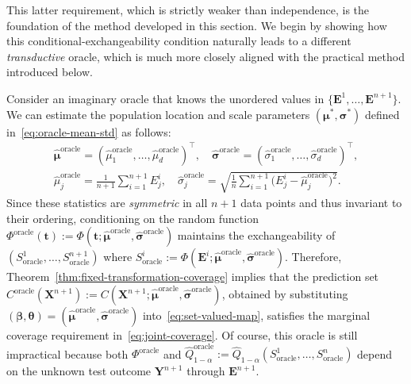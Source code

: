 This latter requirement, which is strictly weaker than independence, is the foundation of the method developed in this section.
We begin by showing how this conditional-exchangeability condition naturally leads to a different \emph{transductive} oracle, which is much more closely aligned with the practical method introduced below.

{\color{blue}
Consider an imaginary oracle that knows the unordered values in $\{\mathbf{E}^1,\ldots,\mathbf{E}^{n+1}\}$. We can estimate the population location and scale parameters $(\boldsymbol \mu^*, \boldsymbol\sigma^*)$ defined in~\eqref{eq:oracle-mean-std} as follows:
\begin{equation} \label{eq:transductive-oracle-mean-std}
\begin{aligned}
\boldsymbol{\hat{\mu}}^{\mathrm{oracle}} = (\hat{\mu}^{\mathrm{oracle}}_1,\ldots,\hat{\mu}^{\mathrm{oracle}}_d)^\top,
\quad
\boldsymbol{\hat{\sigma}}^{\mathrm{oracle}} = (\hat{\sigma}^{\mathrm{oracle}}_1,\ldots,\hat{\sigma}^{\mathrm{oracle}}_d)^\top,\\
\hat{\mu}^{\mathrm{oracle}}_j  = \frac{1}{n+1} \sum_{i=1}^{n+1} {E}^i_j,
\quad
\hat{\sigma}^{\mathrm{oracle}}_j 
= \sqrt{\frac{1}{n} \sum_{i=1}^{n+1} \!\bigl({E}^i_j - \hat{\mu}^{\mathrm{oracle}}_j\bigr)^2}.
\end{aligned}
\end{equation}
Since these statistics are \emph{symmetric} in all $n+1$ data points and thus invariant to their ordering, conditioning on the random function $\Phi^\mathrm{oracle}(\mathbf t):=\Phi(\mathbf t; \boldsymbol{\hat{\mu}}^{\mathrm{oracle}}, \boldsymbol{\hat{\sigma}}^{\mathrm{oracle}} )$ maintains the exchangeability of $(S^1_{\mathrm{oracle}},\ldots,S^{n+1}_{\mathrm{oracle}})$ where $S^i_{\mathrm{oracle}}:= \Phi(\mathbf{E}^i; \boldsymbol{\hat{\mu}}^{\mathrm{oracle}}, \boldsymbol{\hat{\sigma}}^{\mathrm{oracle}})$. Therefore, Theorem~\ref{thm:fixed-transformation-coverage} implies that the prediction set ${C}^{\mathrm{oracle}}(\mathbf{X}^{n+1}):= C(\mathbf{X}^{n+1};\hat{\boldsymbol\mu}^{\mathrm{oracle}}, \hat{\boldsymbol\sigma}^{\mathrm{oracle}})$, obtained by substituting $(\boldsymbol \beta, \boldsymbol \theta) = (\hat{\boldsymbol\mu}^{\mathrm{oracle}}, \hat{\boldsymbol\sigma}^{\mathrm{oracle}})$ into~\eqref{eq:set-valued-map}, satisfies the marginal coverage requirement in~\eqref{eq:joint-coverage}.
Of course, this oracle is still impractical because both $\Phi^\mathrm{oracle}$ and $\hat{Q}^{\mathrm{oracle}}_{1-\alpha}:= \hat{Q}_{1-\alpha}(S^1_{\mathrm{oracle}},\ldots,S^n_{\mathrm{oracle}})$ depend on the unknown test outcome $\mathbf{Y}^{n+1}$ through $\mathbf{E}^{n+1}$. 

}
